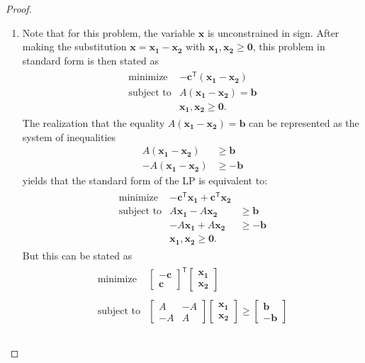 \documentclass[12pt]{article}
\theoremstyle{definition}
\newcommand{\vc}[1]{\boldsymbol{#1}}
\newcommand{\tran}{\mathsf{T}}
\begin{document}
\begin{proof}
  \begin{enumerate}
    \item Note that for this problem, the variable $\vc{x}$ is unconstrained in sign.
      After making the substitution $\vc{x} = \vc{x_1} - \vc{x_2}$ with $\vc{x_1}, \vc{x_2} \geq \vc{0}$,
      this problem in standard form is then stated as
      \begin{align*}
        \begin{array}{rl}
          \text{minimize} & -\vc{c}^\tran(\vc{x_1} - \vc{x_2}) \\
          \text{subject to} & A(\vc{x_1} - \vc{x_2}) = \vc{b} \\
          & \vc{x_1}, \vc{x_2} \geq \vc{0}.
        \end{array}
      \end{align*}
      The realization that the equality $A(\vc{x_1} - \vc{x_2}) = \vc{b}$ can
      be represented as the system of inequalities
      \begin{align*}
        A(\vc{x_1} - \vc{x_2}) &\geq \vc{b} \\
        -A(\vc{x_1} - \vc{x_2}) &\geq -\vc{b}
      \end{align*}
      yields that the standard form of the LP is equivalent to:
      \begin{align*}
        \begin{array}{rrl}
          \text{minimize} & -\vc{c}^\tran\vc{x_1} + \vc{c}^\tran \vc{x_2} &\\
          \text{subject to} & A\vc{x_1} -A\vc{x_2} &\geq \vc{b}\\
          & -A\vc{x_1} + A\vc{x_2} &\geq -\vc{b} \\
          & \vc{x_1}, \vc{x_2} \geq \vc{0}. &
        \end{array}
      \end{align*}
      But this can be stated as
      \begin{align*}
        \begin{array}{rl}
          \text{minimize} & \begin{bmatrix}-\vc{c} \\ \vc{c}\end{bmatrix}^\tran \begin{bmatrix}\vc{x_1} \\ \vc{x_2}\end{bmatrix} \\ \\
          \text{subject to} & \begin{bmatrix}A & -A \\ -A & A\end{bmatrix} \begin{bmatrix}\vc{x_1} \\ \vc{x_2}\end{bmatrix} \geq \begin{bmatrix}\vc{b} \\ -\vc{b}\end{bmatrix}\\ \\

\end{array}
\end{align*}
\end{enumerate}
\end{proof}
\end{document}
